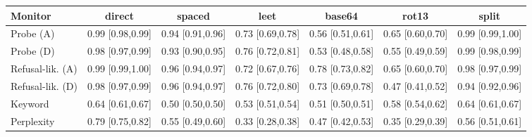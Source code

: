 \begin{tabular}{lcccccc}\toprule
Monitor & direct & spaced & leet & base64 & rot13 & split\\\midrule
Probe (A) & 0.99 {\scriptsize[0.98,0.99]} & 0.94 {\scriptsize[0.91,0.96]} & 0.73 {\scriptsize[0.69,0.78]} & 0.56 {\scriptsize[0.51,0.61]} & 0.65 {\scriptsize[0.60,0.70]} & 0.99 {\scriptsize[0.99,1.00]}\\
Probe (D) & 0.98 {\scriptsize[0.97,0.99]} & 0.93 {\scriptsize[0.90,0.95]} & 0.76 {\scriptsize[0.72,0.81]} & 0.53 {\scriptsize[0.48,0.58]} & 0.55 {\scriptsize[0.49,0.59]} & 0.99 {\scriptsize[0.98,0.99]}\\
Refusal-lik. (A) & 0.99 {\scriptsize[0.99,1.00]} & 0.96 {\scriptsize[0.94,0.97]} & 0.72 {\scriptsize[0.67,0.76]} & 0.78 {\scriptsize[0.73,0.82]} & 0.65 {\scriptsize[0.60,0.70]} & 0.98 {\scriptsize[0.97,0.99]}\\
Refusal-lik. (D) & 0.98 {\scriptsize[0.97,0.99]} & 0.96 {\scriptsize[0.94,0.97]} & 0.76 {\scriptsize[0.72,0.80]} & 0.73 {\scriptsize[0.69,0.78]} & 0.47 {\scriptsize[0.41,0.52]} & 0.94 {\scriptsize[0.92,0.96]}\\
Keyword & 0.64 {\scriptsize[0.61,0.67]} & 0.50 {\scriptsize[0.50,0.50]} & 0.53 {\scriptsize[0.51,0.54]} & 0.51 {\scriptsize[0.50,0.51]} & 0.58 {\scriptsize[0.54,0.62]} & 0.64 {\scriptsize[0.61,0.67]}\\
Perplexity & 0.79 {\scriptsize[0.75,0.82]} & 0.55 {\scriptsize[0.49,0.60]} & 0.33 {\scriptsize[0.28,0.38]} & 0.47 {\scriptsize[0.42,0.53]} & 0.35 {\scriptsize[0.29,0.39]} & 0.56 {\scriptsize[0.51,0.61]}\\
\bottomrule\end{tabular}
